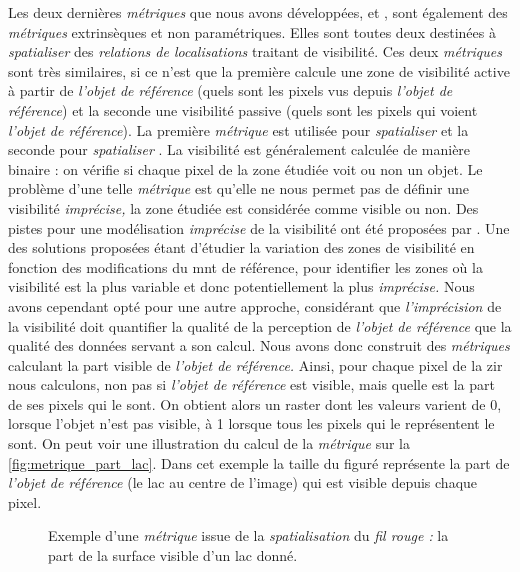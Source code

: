 Les deux dernières \emph{métriques} que nous avons développées,
 et , sont également des
\emph{métriques} extrinsèques et non paramétriques. Elles sont toutes
deux destinées à \emph{spatialiser} des \emph{relations de
  localisations} traitant de visibilité. Ces deux \emph{métriques}
sont très similaires, si ce n'est que la première calcule une zone de
visibilité active à partir de \emph{l'objet de référence} (\ie quels
sont les pixels vus depuis \emph{l'objet de référence}) et la seconde
une visibilité passive (\ie quels sont les pixels qui voient
\emph{l'objet de référence}). La première \emph{métrique} est utilisée
pour \emph{spatialiser}  et la seconde
pour \emph{spatialiser} . La visibilité
est généralement calculée de manière binaire : on vérifie si chaque
pixel de la zone étudiée voit ou non un objet. Le problème d'une telle
\emph{métrique} est qu'elle ne nous permet pas de définir une
visibilité \emph{imprécise,} la zone étudiée est considérée comme
visible ou non. Des pistes pour une modélisation \emph{imprécise} de
la visibilité ont été proposées par
\textcite{Fisher1991,Fisher1992}. Une des solutions proposées étant
d'étudier la variation des zones de visibilité en fonction des
modifications du \ac{mnt} de référence, pour identifier les zones où
la visibilité est la plus variable et donc potentiellement la plus
\emph{imprécise.}  Nous avons cependant opté pour une autre approche,
considérant que \emph{l'imprécision} de la visibilité doit quantifier
la qualité de la perception de \emph{l'objet de référence} que la
qualité des données servant a son calcul. Nous avons donc construit
des \emph{métriques} calculant la part visible de \emph{l'objet de
  référence.} Ainsi, pour chaque pixel de la \ac{zir} nous calculons,
non pas si \emph{l'objet de référence} est visible, mais quelle est la
part de ses pixels qui le sont. On obtient alors un raster dont les
valeurs varient de 0, lorsque l'objet n'est pas visible, à 1 lorsque
tous les pixels qui le représentent le sont. On peut voir une
illustration du calcul de la \emph{métrique}  sur
la \autoref{fig:metrique_part_lac}. Dans cet exemple la taille du
figuré représente la part de \emph{l'objet de référence} (le lac au
centre de l'image) qui est visible depuis chaque pixel.

\begin{figure}
  \centering
  
  \caption{Exemple d'une \emph{métrique} issue de la
    \emph{spatialisation} du \emph{fil rouge :} la part de la surface
    visible d'un lac donné.}
  \label{fig:metrique_part_lac}
\end{figure}

